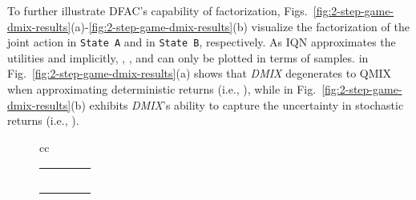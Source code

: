 \documentclass{article}
\newcommand{\dmix}{\textit{DMIX}}
\newcommand{\bb}[1]{\textcolor{myblue}{#1}}
\newcommand{\cc}[1]{\textcolor{crimson}{#1}}
\begin{document}
To further illustrate DFAC's capability of factorization, Figs.~\ref{fig:2-step-game-dmix-results}(a)-\ref{fig:2-step-game-dmix-results}(b) visualize the factorization of the joint action  in \texttt{State A} and  in \texttt{State B}, respectively.
As IQN approximates the utilities  and  implicitly,  , , and  can only be plotted in terms of samples.  in Fig.~\ref{fig:2-step-game-dmix-results}(a) shows that \dmix{} degenerates to QMIX when approximating deterministic returns (i.e., ), while  in Fig.~\ref{fig:2-step-game-dmix-results}(b) exhibits \dmix{}'s ability to capture the uncertainty in stochastic returns (i.e., ).

     \begin{figure*}[t]
\begin{tabular}{cc}
\begin{minipage}{0.47\textwidth}
\scriptsize
\setlength{\extrarowheight}{3pt}
\centering
{}\vspace{0.5cm}
\begin{tikzpicture}[overlay]
    \node[] at (0,0) {};
    \node[] at (4.6,1.15) {\texttt{State }};
    \draw[-latex] (4.6,1.15-0.2) -- (4.6-0.8,0.4) node[] [midway, above, sloped] {\cc{}};
    \draw[-latex] (4.6,1.15-0.2) -- (4.6+0.8,0.4) node[] [midway, above, sloped] {\cc{}};
\end{tikzpicture}
\begin{tabular}{cc|*{2}{>{\centering\arraybackslash}p{.11\linewidth}|}}
	& \multicolumn{1}{c}{} & \multicolumn{2}{c}{\bb{Agent }} \\
	& \multicolumn{1}{c}{} & \multicolumn{1}{c}{\bb{}}  & \multicolumn{1}{c}{\bb{}} \\ 
	\cline{3-4}
    \multirow{2}{*}{\rotatebox[origin=c]{90}{\cc{Agent }}} & \cc{} &  &  \\ \cline{3-4}
    & \cc{} &  &   \\\cline{3-4}
    & \multicolumn{1}{c}{}  & \multicolumn{2}{c}{\texttt{State A}} \\
\end{tabular}

\end{minipage}
\end{tabular}
\end{figure*}
\end{document}

